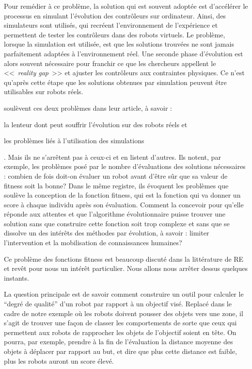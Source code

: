 Pour remédier à ce problème, la solution qui est souvent adoptée est d'accélérer le processus en simulant l'évolution des contrôleurs sur ordinateur. Ainsi, des simulateurs sont utilisés, qui recréent l'environnement de l'expérience et permettent de tester les contrôleurs dans des robots virtuels. Le problème, lorsque la simulation est utilisée, est que les solutions trouvées ne sont jamais parfaitement adaptées à l'environnement réel. Une seconde phase d'évolution est alors souvent nécessaire pour franchir ce que les chercheurs appellent le <<~\emph{reality gap}~>> et ajuster les contrôleurs aux contraintes physiques. Ce n'est qu'après cette étape que les solutions obtenues par simulation peuvent être utilisables sur robots réels.

\cite{mataric96challengesinevolvingcontrollersforphysicalrobots} soulèvent ces deux problèmes dans leur article, à savoir :
\begin{inparaenum}
\item la lenteur dont peut souffrir l'évolution sur des robots réels et
\item les problèmes liés à l'utilisation des simulations
\end{inparaenum}. Mais ils ne s'arrêtent pas à ceux-ci et en listent d'autres. Ils notent, par exemple, les problèmes posé par le nombre d'évaluations des solutions nécessaires : combien de fois doit-on évaluer un robot avant d'être sûr que sa valeur de fitness soit la bonne? Dans le même registre, ils évoquent les problèmes que soulève la conception de la fonction fitness, qui est la fonction qui va donner un score à chaque individu après son évaluation. Comment la concevoir pour qu'elle réponde aux attentes et que l'algorithme évolutionnaire puisse trouver une solution sans que construire cette fonction soit trop complexe et sans que se dissolve un des intérêts des méthodes par évolution, à savoir : limiter l'intervention et la mobilisation de connaissances humaines?

Ce problème des fonctions fitness est beaucoup discuté dans la littérature de RE et revêt pour nous un intérêt particulier. Nous allons nous arrêter dessus quelques instants.

La question principale est de savoir comment construire un outil pour calculer le ``degré de qualité'' d'un robot par rapport à un objectif visé. Replacé dans le cadre de notre exemple où les robots doivent pousser des objets vers une zone, il s'agit de trouver une façon de classer les comportements de sorte que ceux qui permettent aux robots de rapprocher les objets de l'objectif soient en tête. On pourra, par exemple, prendre à la fin de l'évaluation la distance moyenne des objets à déplacer par rapport au but, et dire que plus cette distance est faible, plus les robots auront un score élevé.

